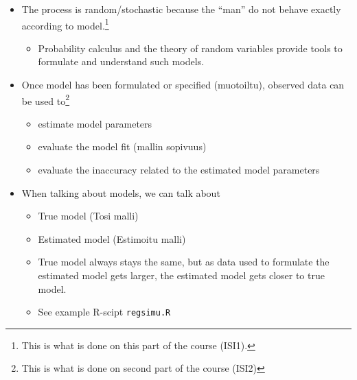 \documentclass[10pt, twoside, a4paper]{book}
\theoremstyle{definition}
\begin{document}
\begin{itemize}
  \item The process is random/stochastic because the ``man'' do not behave
  exactly according to model.\footnote{This is what is done on this part of the
  course (ISI1).}
  \begin{itemize}
    \item Probability calculus and the theory of random variables provide
    tools to formulate and understand such models.
  \end{itemize}
  \item Once model has been formulated or specified (muotoiltu), observed data
  can be used to\footnote{This is what is done on second part of the course
  (ISI2)}
  \begin{itemize}
    \item estimate model parameters
    \item evaluate the model fit (mallin sopivuus)
    \item evaluate the inaccuracy related to the estimated model parameters
  \end{itemize}
  \item When talking about models, we can talk about
  \begin{itemize}
    \item True model (Tosi malli)
    \item Estimated model (Estimoitu malli)
    \item True model always stays the same, but as data used to formulate the
    estimated model gets larger, the estimated model gets closer to true model.
    \item See example R-scipt \verb#regsimu.R#
  \end{itemize}
\end{itemize}
\end{document}
